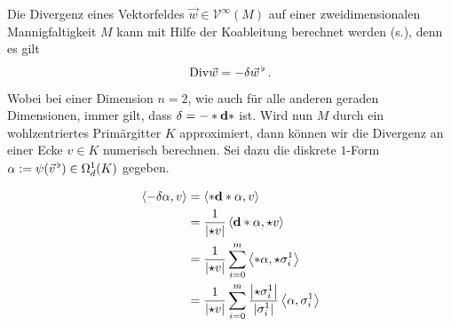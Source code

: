   \begin{beispiel}[Divergenz]
    \label{bspDivergenz}
    Die Divergenz eines Vektorfeldes \( \vec{w}\in\mathcal{V}^{\infty}(M) \) auf einer zweidimensionalen Mannigfaltigkeit \( M \) kann mit Hilfe 
    der Koableitung berechnet werden (s.\cite{Marsden}), denn es gilt
    \begin{align}
      \text{Div}\vec{w} = -\delta\vec{w}^{\,\flat} \,\text{.}
    \end{align}
    Wobei bei einer Dimension \( n=2 \), wie auch für alle anderen geraden Dimensionen, immer gilt, dass \( \delta = -*\mathbf{d} * \) ist.
    Wird nun \( M \) durch ein wohlzentriertes Primärgitter \( K \) approximiert, dann können wir die Divergenz an einer Ecke \( v\in K \) numerisch berechnen.
    Sei dazu die diskrete \( 1 \)-Form 
    \( \alpha:=\psi(\vec{v}^{\,\flat})\in\Omega_{d}^{1}(K) \)
    gegeben.\\
    \begin{minipage}[b]{0.3\textwidth}
        \centering
    \end{minipage}
    \hfill
    \begin{minipage}[b]{0.6\textwidth}
    \begin{align}
    \begin{aligned}
      \left\langle -\delta\alpha,v \right\rangle
          &= \left\langle *\mathbf{d} * \alpha , v \right\rangle \\
          &= \frac{1}{\left| \star v \right|} \left\langle \mathbf{d} * \alpha , \star v \right\rangle \\
          &= \frac{1}{\left| \star v \right|} \sum_{i=0}^{m} \left\langle *\alpha , \star\sigma^{1}_{i} \right\rangle \\
          &= \frac{1}{\left| \star v \right|} \sum_{i=0}^{m} \frac{\left| \star\sigma^{1}_{i} \right|}{\left|\sigma^{1}_{i} \right|}
                                                              \left\langle \alpha , \sigma^{1}_{i} \right\rangle
    \end{aligned}
    \end{align}
    \end{minipage}
  \end{beispiel}

